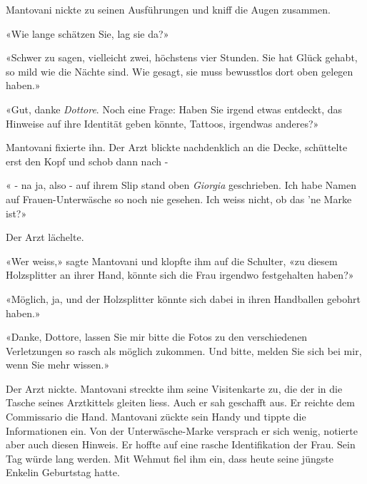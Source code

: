 Mantovani nickte zu seinen Ausführungen und kniff die 
Augen zusammen.

«Wie lange schätzen Sie, lag sie da?»

«Schwer zu sagen, vielleicht zwei, höchstens vier Stunden. Sie hat Glück
gehabt, so mild wie die Nächte sind. Wie gesagt, sie muss bewusstlos
dort oben gelegen haben.»

«Gut, danke \emph{Dottore}. Noch eine Frage: Haben Sie irgend etwas
entdeckt, das Hinweise auf ihre Identität geben könnte, Tattoos,
irgendwas anderes?»

Mantovani fixierte ihn. Der Arzt blickte nachdenklich an die Decke,
schüttelte erst den Kopf und schob dann nach - 

« - na ja, also - auf ihrem Slip stand oben \emph{Giorgia} geschrieben.
Ich habe Namen auf Frauen-Unterwäsche so noch nie gesehen. Ich weiss
nicht, ob das ’ne Marke ist?»

Der Arzt lächelte.

«Wer weiss,» sagte Mantovani und klopfte ihm auf die Schulter, «zu
diesem Holzsplitter an ihrer Hand, könnte sich die Frau irgendwo
festgehalten haben?»

«Möglich, ja, und der Holzsplitter könnte sich dabei in ihren Handballen
gebohrt haben.»

«Danke, Dottore, lassen Sie mir bitte die Fotos zu den verschiedenen
Verletzungen so rasch als möglich zukommen. Und bitte, melden Sie sich
bei mir, wenn Sie mehr wissen.»

Der Arzt nickte. Mantovani streckte ihm seine Visitenkarte zu, die der
in die Tasche seines Arztkittels gleiten liess. Auch er sah geschafft
aus. Er reichte dem Commissario die Hand. 
Mantovani zückte sein Handy und tippte die Informationen ein. Von der
Unterwäsche-Marke versprach er sich wenig, notierte aber auch diesen
Hinweis. Er hoffte auf eine rasche Identifikation der Frau.
Sein Tag würde lang werden. Mit Wehmut fiel ihm ein, dass heute seine
jüngste Enkelin Geburtstag hatte.
